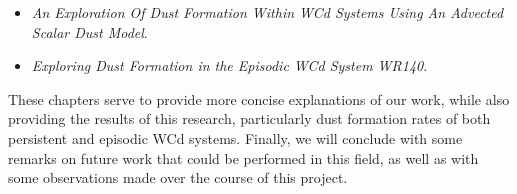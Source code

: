 \begin{itemize}
  \item \emph{An Exploration Of Dust Formation Within WCd Systems Using An Advected Scalar Dust Model}.
  \item \emph{Exploring Dust Formation in the Episodic WCd System WR140}.
\end{itemize}

\noindent
These chapters serve to provide more concise explanations of our work, while also providing the results of this research, particularly dust formation rates of both persistent and episodic WCd systems.
Finally, we will conclude with some remarks on future work that could be performed in this field, as well as with some observations made over the course of this project.